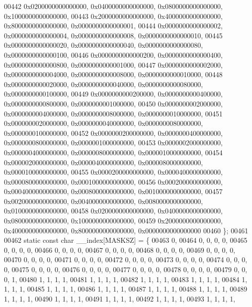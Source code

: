 \begin{DoxyCode}
00442         0x0200000000000000, 0x0400000000000000, 0x0800000000000000, 0x1000000000000000,
00443         0x2000000000000000, 0x4000000000000000, 0x8000000000000000, 0x0000000000000001,
00444         0x0000000000000002, 0x0000000000000004, 0x0000000000000008, 0x0000000000000010,
00445         0x0000000000000020, 0x0000000000000040, 0x0000000000000080, 0x0000000000000100,
00446         0x0000000000000200, 0x0000000000000400, 0x0000000000000800, 0x0000000000001000,
00447         0x0000000000002000, 0x0000000000004000, 0x0000000000008000, 0x0000000000010000,
00448         0x0000000000020000, 0x0000000000040000, 0x0000000000080000, 0x0000000000100000,
00449         0x0000000000200000, 0x0000000000400000, 0x0000000000800000, 0x0000000001000000,
00450         0x0000000002000000, 0x0000000004000000, 0x0000000008000000, 0x0000000010000000,
00451         0x0000000020000000, 0x0000000040000000, 0x0000000080000000, 0x0000000100000000,
00452         0x0000000200000000, 0x0000000400000000, 0x0000000800000000, 0x0000001000000000,
00453         0x0000002000000000, 0x0000004000000000, 0x0000008000000000, 0x0000010000000000,
00454         0x0000020000000000, 0x0000040000000000, 0x0000080000000000, 0x0000100000000000,
00455         0x0000200000000000, 0x0000400000000000, 0x0000800000000000, 0x0001000000000000,
00456         0x0002000000000000, 0x0004000000000000, 0x0008000000000000, 0x0010000000000000,
00457         0x0020000000000000, 0x0040000000000000, 0x0080000000000000, 0x0100000000000000,
00458         0x0200000000000000, 0x0400000000000000, 0x0800000000000000, 0x1000000000000000,
00459         0x2000000000000000, 0x4000000000000000, 0x8000000000000000, 0x0000000000000000
00460 \};
00461 
00462 \textcolor{keyword}{static} \textcolor{keyword}{const} \textcolor{keywordtype}{char} \_\_index[MASKSZ] = \{
00463         0,
00464         0, 0, 0, 0,
00465         0, 0, 0, 0,
00466         0, 0, 0, 0,
00467         0, 0, 0, 0,
00468         0, 0, 0, 0,
00469         0, 0, 0, 0,
00470         0, 0, 0, 0,
00471         0, 0, 0, 0,
00472         0, 0, 0, 0,
00473         0, 0, 0, 0,
00474         0, 0, 0, 0,
00475         0, 0, 0, 0,
00476         0, 0, 0, 0,
00477         0, 0, 0, 0,
00478         0, 0, 0, 0,
00479         0, 0, 0, 1,
00480         1, 1, 1, 1,
00481         1, 1, 1, 1,
00482         1, 1, 1, 1,
00483         1, 1, 1, 1,
00484         1, 1, 1, 1,
00485         1, 1, 1, 1,
00486         1, 1, 1, 1,
00487         1, 1, 1, 1,
00488         1, 1, 1, 1,
00489         1, 1, 1, 1,
00490         1, 1, 1, 1,
00491         1, 1, 1, 1,
00492         1, 1, 1, 1,
00493         1, 1, 1, 1,

\end{DoxyCode}
